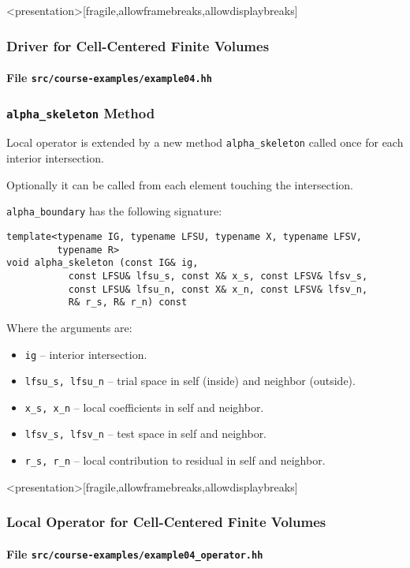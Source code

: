 \begin{frame}<presentation>[fragile,allowframebreaks,allowdisplaybreaks]
\frametitle<presentation>{Driver for Cell-Centered Finite Volumes}
\framesubtitle<presentation>{File \texttt{src/course-examples/example04.hh}}

\end{frame}

\begin{frame}[fragile]
\frametitle{\lstinline{alpha_skeleton} Method}
Local operator is extended by a new method \lstinline{alpha_skeleton}
called once for each interior intersection.

Optionally it can be called from each element touching the intersection.

\lstinline{alpha_boundary} has the following signature:
\begin{lstlisting}[basicstyle=\scriptsize]
template<typename IG, typename LFSU, typename X, typename LFSV,
         typename R>
void alpha_skeleton (const IG& ig,
           const LFSU& lfsu_s, const X& x_s, const LFSV& lfsv_s,
           const LFSU& lfsu_n, const X& x_n, const LFSV& lfsv_n,
           R& r_s, R& r_n) const
\end{lstlisting}
Where the arguments are:
\begin{itemize}
\item \lstinline{ig} -- interior intersection.
\item \lstinline{lfsu_s, lfsu_n} -- trial space in self (inside) and neighbor (outside).
\item \lstinline{x_s, x_n} -- local coefficients in self and neighbor.
\item \lstinline{lfsv_s, lfsv_n} -- test space in self and neighbor.
\item \lstinline{r_s, r_n} -- local contribution to residual in self and neighbor.
\end{itemize}
\end{frame}

\begin{frame}<presentation>[fragile,allowframebreaks,allowdisplaybreaks]
\frametitle<presentation>{Local Operator for Cell-Centered Finite Volumes}
\framesubtitle<presentation>{File \texttt{src/course-examples/example04\_operator.hh}}

\end{frame}


